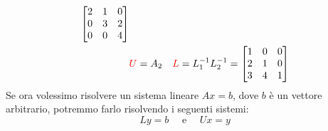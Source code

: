 \documentclass{article}
\begin{document}
\begin{example}
\begin{equation*}
\begin{aligned}
\begin{bmatrix}
               2 & 1 & 0 \\ 
               0 & 3 & 2 \\ 
               0 & 0 & 4
           \end{bmatrix}\\
           & {\color{red}U}=A_2 & {\color{red}L}=L_{1}^{-1}L_{2}^{-1}=\begin{bmatrix}
               1 & 0 & 0 \\ 
               2 & 1 & 0 \\ 
               3 & 4 & 1
           \end{bmatrix}
       \end{aligned} 
    \end{equation*}
    Se ora volessimo risolvere un sistema lineare $Ax=b$, dove $b$ è un
    vettore arbitrario, potremmo farlo risolvendo i seguenti sistemi:
    $$Ly=b\quad\text{ e }\quad Ux=y$$
\end{example}
\end{document}
